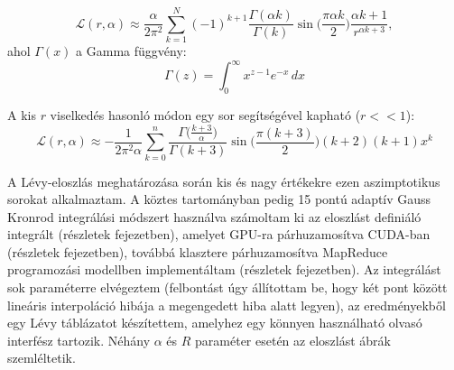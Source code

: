 \documentclass[11pt,a4paper]{article}
\numberwithin{equation}{subsection}
\numberwithin{figure}{section}
\begin{document}
\begin{equation}
\mathcal{L}(r,\alpha) \approx \frac{\alpha}{2\pi^2}\sum_{k=1}^{N}(-1)^{k+1}\frac{\Gamma(\alpha k)}{\Gamma(k)} \sin{\bigg(\frac{\pi\alpha k}{2}\bigg)}\frac{\alpha k+1}{r^{\alpha k+3}},
\end{equation}
ahol $\Gamma(x)$ a Gamma függvény:
\begin{equation}
 \Gamma (z)=\int _{0}^{\infty }x^{z-1}e^{-x}\,dx
 \label{eq:gamma}
\end{equation}

A kis $r$ viselkedés hasonló módon egy sor segítségével kapható ($r<<1$):
\begin{equation}
\mathcal{L}(r,\alpha) \approx -\frac{1}{2\pi^2\alpha}\sum_{k=0}^n\frac{\Gamma\big(\frac{k+3}{\alpha}\big)}{\Gamma(k+3)}\sin{\bigg(\frac{\pi(k+3)}{2}\bigg)}(k+2)(k+1)x^k
\end{equation} 

A Lévy-eloszlás meghatározása során kis és nagy értékekre ezen aszimptotikus sorokat alkalmaztam. A köztes tartományban pedig 15 pontú adaptív Gauss Kronrod integrálási módszert használva számoltam ki az eloszlást definiáló integrált (részletek  fejezetben), amelyet GPU-ra párhuzamosítva CUDA-ban (részletek  fejezetben), továbbá klasztere párhuzamosítva MapReduce programozási modellben implementáltam (részletek  fejezetben). Az integrálást sok paraméterre elvégeztem (felbontást úgy állítottam be, hogy két pont között lineáris interpoláció hibája a megengedett hiba alatt legyen), az eredményekből egy Lévy táblázatot készítettem, amelyhez egy könnyen használható olvasó interfész tartozik. Néhány $\alpha$ és $R$ paraméter esetén az eloszlást  ábrák szemléltetik.
\end{document}
